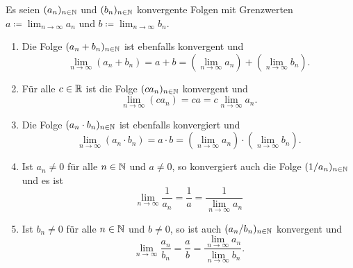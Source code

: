 \documentclass[a4paper,10pt]{article}
\begin{document}
\begin{prop}
 Es seien $(a_n)_{n \in \mathbb{N}}$ und $(b_n)_{n \in \mathbb{N}}$ konvergente Folgen mit Grenzwerten $a \coloneqq \lim_{n \to \infty} a_n$ und $b \coloneqq \lim_{n \to \infty} b_n$.
 \begin{enumerate}
  \item
   Die Folge $(a_n + b_n)_{n \in \mathbb{N}}$ ist ebenfalls konvergent und
   \[
    \lim_{n \to \infty} (a_n + b_n)
    = a + b
    = \left(\lim_{n \to \infty} a_n\right) + \left(\lim_{n \to \infty} b_n\right).
   \]
  \item
   Für alle $c \in \mathbb{R}$ ist die Folge $(c a_n)_{n \in \mathbb{N}}$ konvergent und
   \[
    \lim_{n \to \infty} (c a_n)
    = c a
    = c \lim_{n \to \infty} a_n.
   \]
  \item
   Die Folge $(a_n \cdot b_n)_{n \in \mathbb{N}}$ ist ebenfalls konvergiert und
   \[
    \lim_{n \to \infty} (a_n \cdot b_n)
    = a \cdot b
    = \left(\lim_{n \to \infty} a_n\right) \cdot \left(\lim_{n \to \infty} b_n\right).
   \]
  \item
   Ist $a_n \neq 0$ für alle $n \in \mathbb{N}$ und $a \neq 0$, so konvergiert auch die Folge $(1/a_n)_{n \in \mathbb{N}}$ und es ist
   \[
    \lim_{n \to \infty} \frac{1}{a_n}
    = \frac{1}{a}
    = \frac{1}{\lim_{n \to \infty} a_n}
   \]
  \item
   Ist $b_n \neq 0$ für alle $n \in \mathbb{N}$ und $b \neq 0$, so ist auch $(a_n/b_n)_{n \in \mathbb{N}}$ konvergent und
   \[
    \lim_{n \to \infty} \frac{a_n}{b_n}
    = \frac{a}{b}
    = \frac{\lim_{n \to \infty} a_n}{\lim_{n \to \infty} b_n}.
   \]
 \end{enumerate}
\end{prop}
\end{document}
